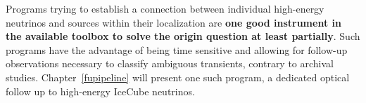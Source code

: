 Programs trying to establish a connection between individual high-energy neutrinos and sources within their localization are \textbf{one good instrument in the available toolbox to solve the origin question at least partially}. Such programs have the advantage of being time sensitive and allowing for follow-up observations necessary to classify ambiguous transients, contrary to archival studies. Chapter~\ref{fupipeline} will present one such program, a dedicated optical follow up to high-energy IceCube neutrinos.


